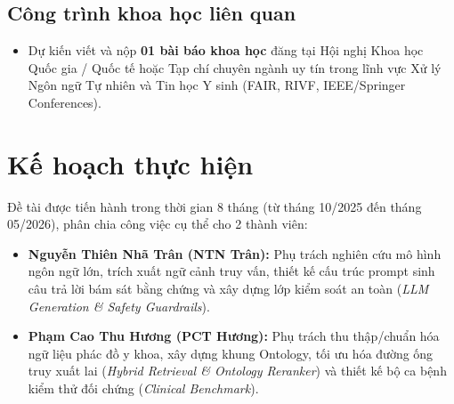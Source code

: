 \documentclass[12pt,a4paper]{article}
\begin{document}
\subsection{Công trình khoa học liên quan}
\begin{itemize}[leftmargin=1.27cm]
    \item Dự kiến viết và nộp \textbf{01 bài báo khoa học} đăng tại Hội nghị Khoa học Quốc gia / Quốc tế hoặc Tạp chí chuyên ngành uy tín trong lĩnh vực Xử lý Ngôn ngữ Tự nhiên và Tin học Y sinh (FAIR, RIVF, IEEE/Springer Conferences).
\end{itemize}

\section{Kế hoạch thực hiện}

Đề tài được tiến hành trong thời gian 8 tháng (từ tháng 10/2025 đến tháng 05/2026), phân chia công việc cụ thể cho 2 thành viên:
\begin{itemize}[leftmargin=1.27cm]
    \item \textbf{Nguyễn Thiên Nhã Trân (NTN Trân):} Phụ trách nghiên cứu mô hình ngôn ngữ lớn, trích xuất ngữ cảnh truy vấn, thiết kế cấu trúc prompt sinh câu trả lời bám sát bằng chứng và xây dựng lớp kiểm soát an toàn (\textit{LLM Generation \& Safety Guardrails}).
    \item \textbf{Phạm Cao Thu Hương (PCT Hương):} Phụ trách thu thập/chuẩn hóa ngữ liệu phác đồ y khoa, xây dựng khung Ontology, tối ưu hóa đường ống truy xuất lai (\textit{Hybrid Retrieval \& Ontology Reranker}) và thiết kế bộ ca bệnh kiểm thử đối chứng (\textit{Clinical Benchmark}).
\end{itemize}
\end{document}
